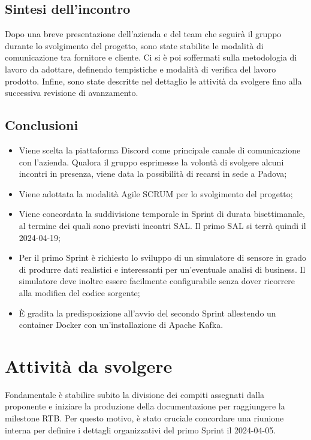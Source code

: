 \documentclass[8pt]{article}
\begin{document}
\subsection{Sintesi dell'incontro}
Dopo una breve presentazione dell'azienda e del team che seguirà il gruppo durante lo svolgimento del progetto, sono state stabilite le modalità di comunicazione tra fornitore e cliente. Ci si è poi soffermati sulla metodologia di lavoro da adottare, definendo tempistiche e modalità di verifica del lavoro prodotto. Infine, sono state descritte nel dettaglio le attività da svolgere fino alla successiva revisione di avanzamento.

\subsection{Conclusioni}
\begin{itemize}
	\setlength\itemsep{0em}
	\item Viene scelta la piattaforma Discord come principale canale di comunicazione con l'azienda. Qualora il gruppo esprimesse la volontà di svolgere alcuni incontri in presenza, viene data la possibilità di recarsi in sede a Padova;
	\item Viene adottata la modalità Agile SCRUM per lo svolgimento del progetto;
        \item Viene concordata la suddivisione temporale in Sprint di durata bisettimanale, al termine dei quali sono previsti incontri SAL. Il primo SAL si terrà quindi il 2024-04-19;
        \item Per il primo Sprint è richiesto lo sviluppo di un simulatore di sensore in grado di produrre dati realistici e interessanti per un'eventuale analisi di business. Il simulatore deve inoltre essere facilmente configurabile senza dover ricorrere alla modifica del codice sorgente;
        \item È gradita la predisposizione all'avvio del secondo Sprint allestendo un container Docker con un'installazione di Apache Kafka.
\end{itemize}
\section{Attività da svolgere}
Fondamentale è stabilire subito la divisione dei compiti assegnati dalla proponente e iniziare la produzione della documentazione per raggiungere la milestone RTB. Per questo motivo, è stato cruciale concordare una riunione interna per definire i dettagli organizzativi del primo Sprint il 2024-04-05.
\end{document}
